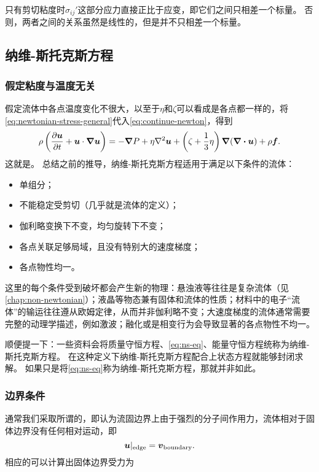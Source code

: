 只有剪切粘度时$\sigma_{ij}'$这部分应力直接正比于应变，即它们之间只相差一个标量。
否则，两者之间的关系虽然是线性的，但是并不只相差一个标量。

\subsection{纳维-斯托克斯方程}

\subsubsection{假定粘度与温度无关}

假定流体中各点温度变化不很大，以至于$\eta$和$\zeta$可以看成是各点都一样的，将\eqref{eq:newtonian-stress-general}代入\eqref{eq:continue-newton}，得到
\begin{equation}
    \rho \left( \pdv{\vb*{u}}{t} + \vb*{u} \cdot \grad \vb*{u} \right) = - \grad{P} + \eta \laplacian \vb*{u} + \left( \zeta + \frac{1}{3} \eta \right) \grad{(\div{\vb*{u}})} + \rho \vb*{f}.
    \label{eq:ns-eq}
\end{equation}
这就是。
总结之前的推导，纳维-斯托克斯方程适用于满足以下条件的流体：
\begin{itemize}
    \item 单组分；
    \item 不能稳定受剪切（几乎就是流体的定义）；
    \item 伽利略变换下不变，均匀旋转下不变；
    \item 各点关联足够局域，且没有特别大的速度梯度；
    \item 各点物性均一。
\end{itemize}
这里的每个条件受到破坏都会产生新的物理：悬浊液等往往是复杂流体（见\autoref{chap:non-newtonian}）；液晶等物态兼有固体和流体的性质；材料中的电子“流体”的输运往往遵从欧姆定律，从而并非伽利略不变；大速度梯度的流体通常需要完整的动理学描述，例如激波；融化或是相变行为会导致显著的各点物性不均一。

顺便提一下：一些资料会将质量守恒方程、\eqref{eq:ns-eq}、能量守恒方程统称为纳维-斯托克斯方程。
在这种定义下纳维-斯托克斯方程配合上状态方程就能够封闭求解。
如果只是将\eqref{eq:ns-eq}称为纳维-斯托克斯方程，那就并非如此。

\subsubsection{边界条件}

通常我们采取所谓的，即认为流固边界上由于强烈的分子间作用力，流体相对于固体边界没有任何相对运动，即
\begin{equation}
    \vb*{u}|_\text{edge} = \vb*{v}_\text{boundary}.
\end{equation}
相应的可以计算出固体边界受力为

